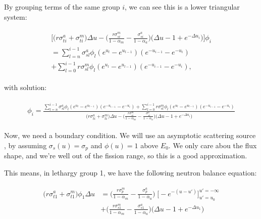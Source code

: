 \documentclass{article}
\begin{document}
        By grouping terms of the same group $i$, we can see this is a lower triangular system:

        \begin{align}
        \begin{split}
            \label{eq:ltri}
            \bigg[ 
                \bigg( r \sigma_{ti}^a + \sigma_{ti}^m  \bigg) \Delta u  - 
                \bigg( \frac{r \sigma_{si}^m }{1-\alpha_m} - \frac{\sigma_{si}^a }{1-\alpha_a}  \bigg)
                \bigg( \Delta u -1 + e^{-\Delta u_i} \bigg) 
            \bigg] \phi_i \\ =
              \sum_{l = n}^{i-1} \sigma_{sl}^a \phi_l  (e^{u_l} - e^{u_{l-1}})   (e^{-u_{i-1}} - e^{-u_{i}}) \\ 
            + \sum_{l = 0}^{i-1} r \sigma_{sl}^m \phi_l  (e^{u_l} - e^{u_{l-1}}) (e^{-u_{i-1}} - e^{-u_{i}}),
        \end{split}
        \end{align}

        with solution:
        
        \begin{align}
        \begin{split}
            \label{eq:soln}
            \phi_i =
            \frac{
                \sum_{l = n}^{i-1} \sigma_{sl}^a \phi_l  (e^{u_l} - e^{u_{l-1}})   (e^{-u_{i-1}} - e^{-u_{i}}) 
                + \sum_{l = 0}^{i-1} r \sigma_{sl}^m \phi_l  (e^{u_l} - e^{u_{l-1}}) (e^{-u_{i-1}} - e^{-u_{i}})
            }
            {  
                \bigg( r \sigma_{ti}^a + \sigma_{ti}^m  \bigg) \Delta u  - 
                \bigg( \frac{r \sigma_{si}^m }{1-\alpha_m} - \frac{\sigma_{si}^a }{1-\alpha_a}  \bigg)
                \bigg( \Delta u -1 + e^{-\Delta u_i} \bigg) 
             }
        \end{split}
        \end{align}

        Now, we need a boundary condition. 
        We will use an asymptotic scattering source , by assuming $\sigma_s(u) = \sigma_p$ and 
        $\phi(u) = 1$ above $E_0$. 
        We only care abou the flux shape, and we're well out of the fission range, so this is a good approximation.
        
        This means, in lethargy group 1, we have the following neutron balance equation:
        
        \begin{align}
        \begin{split}
            \label{eq:balance_group-1}
            \big( r \sigma_{t1}^a + \sigma_{t1}^m  \big) \phi_1 \Delta u &=
            \bigg( \frac{r \sigma_{p}^m }{1-\alpha_m} - \frac{\sigma_{p}^a }{1-\alpha_a} \bigg)
            \; \bigg[ -e^{-(u-u')} \bigg]_{u' = u_0}^{u'= - \infty}
               \\ &+ 
            \bigg( \frac{r \sigma_{s1}^m }{1-\alpha_m} - \frac{\sigma_{s1}^a }{1-\alpha_a}  \bigg)
            \bigg( \Delta u -1 + e^{-\Delta u_1} \bigg) 
        \end{split}
        \end{align}
        
\end{document}

